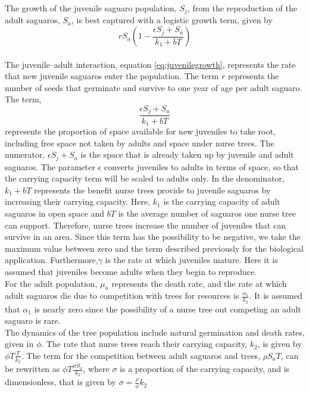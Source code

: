 \documentclass[a4paper]{article}
\begin{document}
The growth of the juvenile saguaro population, $S_j$, from the reproduction of the adult saguaros, $S_a$, is best captured with a logistic growth term, given by
\begin{equation}\label{eq:juvenilegrowth}
rS_a\left(1 - \displaystyle\frac{\epsilon S_j + S_a}{k_1 +b T}\right)
\end{equation}\\
The juvenile--adult interaction, equation \ref{eq:juvenilegrowth}, represents the rate that new juvenile saguaros enter the population. The term $r$ represents the number of seeds that germinate and survive to one year of age per adult saguaro. The term,$$ \displaystyle\frac{\epsilon S_j + S_a}{k_1 +bT}$$ represents the proportion of space available for new juveniles to take root, including free space not taken by adults and space under nurse trees. The numerator, $\epsilon S_j + S_a$ is the space that is already taken up by juvenile and adult saguaros. The parameter $\epsilon$ converts juveniles to adults in terms of space, so that the carrying capacity term will be scaled to adults only. In the denominator, $k_1+bT$ represents the benefit nurse trees provide to juvenile saguaros by increasing their carrying capacity. Here, $k_1$ is the carrying capacity of adult saguaros in open space and $b T$ is the average number of saguaros one nurse tree can support. Therefore, nurse trees increase the number of juveniles that can survive in an area. Since this term has the possibility to be negative, we take the maximum value between zero and the term described previously for the biological application. Furthermore,$\gamma$ is the rate at which juveniles mature. Here it is assumed that juveniles become adults when they begin to reproduce.\\

For the adult population, $\mu_a$ represents the death rate, and the rate at which adult saguaros die due to competition with trees for resources is $\displaystyle\frac{\alpha_1}{k_2}.$ It is assumed that $\alpha_1$ is nearly zero since the possibility of a nurse tree out competing an adult saguaro is rare.\\

The dynamics of the tree population include natural germination and death rates, given in $\phi.$ The rate that nurse trees reach their carrying capacity, $k_2$, is given by $\phi T\displaystyle\frac{T}{k_2}.$ The term for the competition between adult saguaros and trees, $\rho S_a T$, can be rewritten as $\phi T\displaystyle\frac{\sigma S_a}{k_2}$, where $\sigma$ is a proportion of the carrying capacity, and is dimensionless, that is given by $\sigma = \displaystyle\frac{\rho}{\phi}k_2$\\
\end{document}
